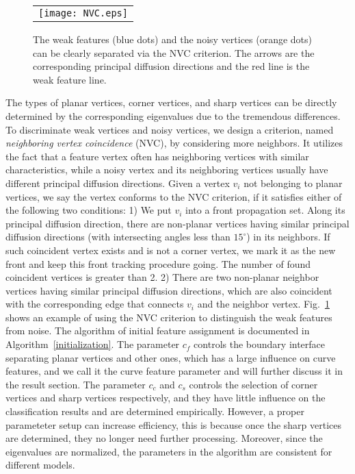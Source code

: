 \documentclass[10pt,journal,cspaper,compsoc]{IEEEtran}
\begin{document}
\begin{figure}
\begin{center}
\begin{tabular}{@{}c@{}}
\texttt{[image: NVC.eps]}\\
\end{tabular}
\caption{The weak features (blue dots) and the noisy vertices
(orange dots) can be clearly separated via the NVC criterion.
The arrows are the corresponding principal diffusion directions
and the red line is the weak feature line.}
\label{fig:NVC}
\end{center}
\end{figure}

The types of planar vertices, corner vertices, and sharp vertices can be directly determined
by the corresponding eigenvalues due to the tremendous
differences. To discriminate weak
vertices and noisy vertices, we design a criterion, named
\emph{neighboring vertex coincidence} (NVC), by considering more
neighbors. It utilizes the fact that a feature vertex often has
neighboring vertices with similar characteristics, while a noisy
vertex and its neighboring vertices usually have different principal
diffusion directions. Given a vertex $v_i$ not belonging to planar
vertices, we say the vertex conforms to the NVC criterion, if it
satisfies either of the following two conditions: 1) We put $v_i$ into
a front propagation set. Along its principal diffusion direction,
there are non-planar vertices having similar principal diffusion
directions (with intersecting angles less than $15^\circ$) in its
neighbors. If such coincident vertex exists and is not a corner
vertex, we mark it as the new front and keep this front tracking
procedure going. The number of found coincident vertices is greater
than 2.  2) There are two non-planar neighbor vertices having similar
principal diffusion directions, which are also coincident with the
corresponding edge that connects $v_i$ and the neighbor vertex.
Fig.~\ref{fig:NVC} shows an example of using the NVC criterion to
distinguish the weak features from noise. The algorithm of initial
feature assignment is documented in Algorithm~\ref{initialization}.
The parameter $c_f$ controls the boundary interface separating planar
vertices and other ones, which has a large influence on curve
features, and we call it the curve feature parameter and will further
discuss it in the result section.  The parameter $c_c$ and $c_s$
controls the selection of corner vertices and sharp vertices
respectively, and they have little influence on the classification
results and are determined empirically.  However, a proper parameteter
setup can increase efficiency, this is because once the sharp vertices
are determined, they no longer need further processing. Moreover,
since the eigenvalues are normalized, the parameters in the algorithm
are consistent for different models.
\end{document}
